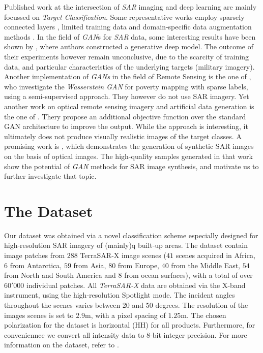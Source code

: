 \documentclass{article}
\begin{document}
Published work at the intersection of \emph{SAR} imaging and deep
learning are mainly focussed on \emph{Target Classification}. Some
representative works employ sparsely connected layers
\cite{chen2016target}, limited training data \cite{lin2017deep} and
domain-specific data augmentation methods
\cite{ding2016convolutional}.
%
%
In the field of \emph{GAN}s for \emph{SAR} data, some interesting
results have been shown by \cite{guo2017synthetic}, where authors
constructed a generative deep model.
%
The outcome of their experiments however remain unconclusive, due to
the scarcity of training data, and particular characteristics of the
underlying targets (military imagery).
%
Another implementation of \emph{GANs} in the field of Remote Sensing
is the one of \cite{perezsemi}, who investigate the \emph{Wasserstein
  GAN} for poverty mapping with sparse labels, using a semi-supervised
approach. They however do not use SAR imagery.
%
Yet another work on optical remote sensing imagery and artificial data
generation is the one of \cite{lin2016deep}. Thery propose an
additional objective function over the standard GAN architecture to
improve the output. While the approach is interesting, it ultimately
does not produce visually realistic images of the target classes.
%
A promising work is \cite{merkle2017possibility}, which demonstrates
the generation of synthetic SAR images on the basis of optical images.
%
The high-quality samples generated in that work show the potential of
\emph{GAN} methods for SAR image synthesis, and motivate us to further
investigate that topic.

\section{The Dataset}
\label{sec:dataset}

Our dataset was obtained via a novel classification scheme especially
designed for high-resolution SAR imagery of (mainly)q built-up areas.
%
The dataset contain image patches from $288$ TerraSAR-X image scenes
($41$ scenes acquired in Africa, $6$ from Antarctica, $59$ from Asia,
$80$ from Europe, $40$ from the Middle East, $54$ from North and South
America and $8$ from ocean surfaces), with a total of over $60'000$
individual patches.
%
All \emph{TerraSAR-X} data are obtained via the X-band instrument,
using the high-resolution Spotlight mode. The incident angles
throughout the scenes varies between 20 and 50 degrees. The resolution
of the images scenes is set to $2.9$m, with a pixel spacing of
$1.25$m.  The chosen polarization for the dataset is horizontal (HH)
for all products.  Furthermore, for conveniennce we convert all
intensity data to 8-bit integer precision.
% 
For more information on the dataset, refer to
\cite{dumitru2016land}.
\end{document}

